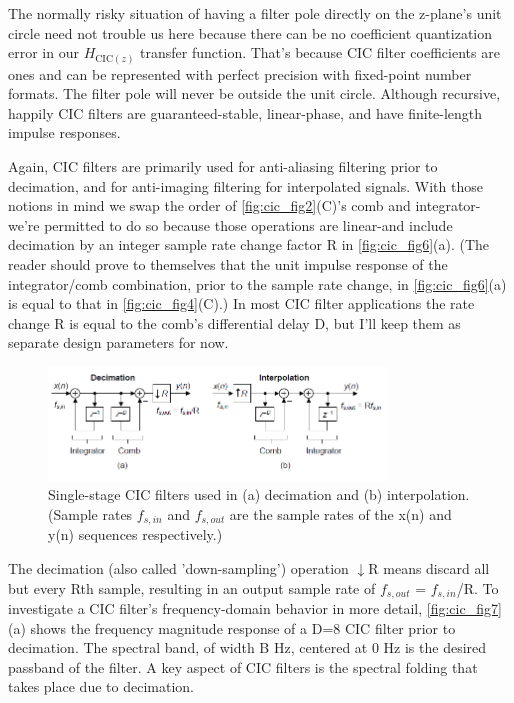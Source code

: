 The normally risky situation of having a filter pole directly on the z-plane's unit circle need not trouble us here because there can be no coefficient quantization error in our $H_{\mathrm{CIC}(z)}$ transfer function. That's because CIC filter coefficients are ones and can be represented with perfect precision with fixed-point number formats. The filter pole will never be outside the unit circle. Although recursive, happily CIC filters are guaranteed-stable, linear-phase, and have finite-length impulse responses.

Again, CIC filters are primarily used for anti-aliasing filtering prior to decimation, and for anti-imaging filtering for interpolated signals. With those notions in mind we swap the order of \autoref{fig:cic_fig2}(C)'s comb and integrator-we're permitted to do so because those operations are linear-and include decimation by an integer sample rate change factor R in \autoref{fig:cic_fig6}(a). (The reader should prove to themselves that the unit impulse response of the integrator/comb combination, prior to the sample rate change, in \autoref{fig:cic_fig6}(a) is equal to that in \autoref{fig:cic_fig4}(C).) In most CIC filter applications the rate change R is equal to the comb's differential delay D, but I'll keep them as separate design parameters for now.

\begin{figure}[!ht]
    \centering
    \includegraphics[width=0.8\textwidth]{images/CIC_Filter/CIC_digital_filters_fig6.png}
    \caption{Single-stage CIC filters used in (a) decimation and (b) interpolation. (Sample rates $f_{s,in}$ and $f_{s,out}$ are the sample rates of the x(n) and y(n) sequences respectively.)}
    \label{fig:cic_fig6}
\end{figure}

The decimation (also called 'down-sampling') operation $\downarrow$R means discard all but every Rth sample, resulting in an output sample rate of $f_{s,out}$ = $f_{s,in}$/R. To investigate a CIC filter's frequency-domain behavior in more detail, \autoref{fig:cic_fig7}(a) shows the frequency magnitude response of a D=8 CIC filter prior to decimation. The spectral band, of width B Hz, centered at 0 Hz is the desired passband of the filter. A key aspect of CIC filters is the spectral folding that takes place due to decimation.

